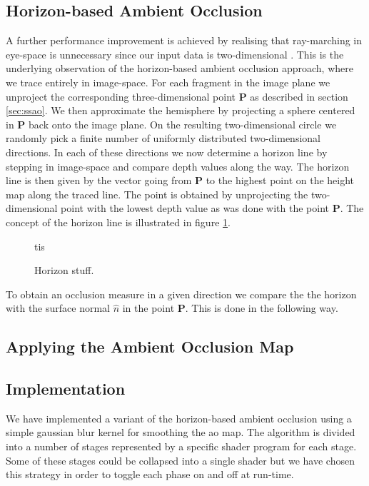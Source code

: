 \subsection{Horizon-based Ambient Occlusion}
\label{sec:hbao}
A further performance improvement is achieved by realising that
ray-marching in eye-space is unnecessary since our input data is
two-dimensional \citep{hbao}. This is the underlying observation of
the horizon-based ambient occlusion approach, where we trace entirely
in image-space. For each fragment in the image plane we unproject the
corresponding three-dimensional point $\mathbf{P}$ as described in
section \ref{sec:ssao}. We then approximate the hemisphere by
projecting a sphere centered in $\mathbf{P}$ back onto the image
plane. On the resulting two-dimensional circle we randomly pick a
finite number of uniformly distributed two-dimensional directions. In
each of these directions we now determine a horizon line by stepping
in image-space and compare depth values along the way. The horizon
line is then given by the vector going from $\mathbf{P}$ to the
highest point on the height map along the traced line. The point is
obtained by unprojecting the two-dimensional point with the lowest
depth value as was done with the point $\mathbf{P}$. The concept of
the horizon line is illustrated in figure \ref{fig:horizon}.
\begin{figure}[h]
  \centering
  tis
  \caption{Horizon stuff.}
  \label{fig:horizon}
\end{figure}
To obtain an occlusion measure in a given direction we compare the
the horizon with the surface normal $\hat{n}$ in the point
$\mathbf{P}$. This is done in the following way.

\subsection{Applying the Ambient Occlusion Map}

\subsection{Implementation}

We have implemented a variant of the horizon-based ambient occlusion
using a simple gaussian blur kernel for smoothing the ao map.  The
algorithm is divided into a number of stages represented by a specific
shader program for each stage. Some of these stages could be collapsed
into a single shader but we have chosen this strategy in order to
toggle each phase on and off at run-time.


